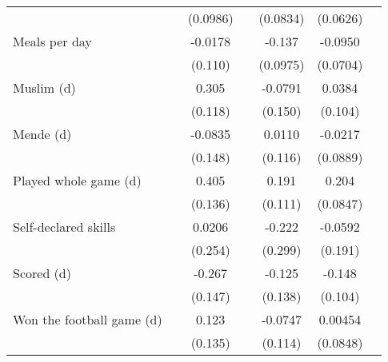{\begin{tabularx}{0.9\textwidth}{Xl*{5}{c}}
                    &                     &    (0.0986)         &                     &    (0.0834)         &    (0.0626)         \\
[0.5em]
Meals per day       &                     &     -0.0178         &                     &      -0.137         &     -0.0950         \\
                    &                     &     (0.110)         &                     &    (0.0975)         &    (0.0704)         \\
[0.5em]
Muslim (d)          &                     &       0.305\sym{***}&                     &     -0.0791         &      0.0384         \\
                    &                     &     (0.118)         &                     &     (0.150)         &     (0.104)         \\
[0.5em]
Mende (d)           &                     &     -0.0835         &                     &      0.0110         &     -0.0217         \\
                    &                     &     (0.148)         &                     &     (0.116)         &    (0.0889)         \\
[0.5em]
Played whole game (d)&                     &       0.405\sym{***}&                     &       0.191\sym{*}  &       0.204\sym{**} \\
                    &                     &     (0.136)         &                     &     (0.111)         &    (0.0847)         \\
[0.5em]
Self-declared skills&                     &      0.0206         &                     &      -0.222         &     -0.0592         \\
                    &                     &     (0.254)         &                     &     (0.299)         &     (0.191)         \\
[0.5em]
Scored (d)          &                     &      -0.267\sym{*}  &                     &      -0.125         &      -0.148         \\
                    &                     &     (0.147)         &                     &     (0.138)         &     (0.104)         \\
[0.5em]
Won the football game (d)&                     &       0.123         &                     &     -0.0747         &     0.00454         \\
                    &                     &     (0.135)         &                     &     (0.114)         &    (0.0848)         \\

\end{tabularx}}

